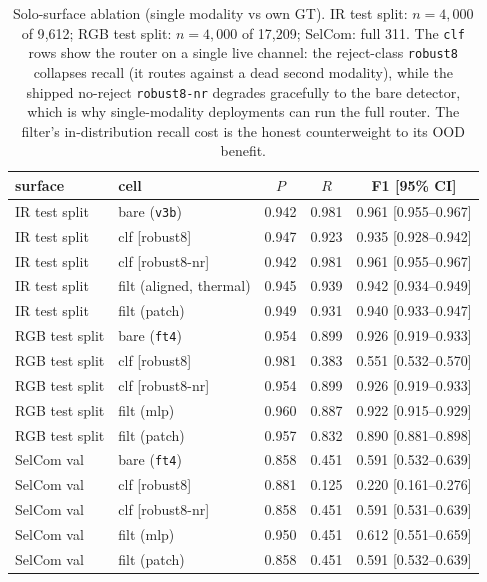 \begin{table}[htbp]
    \centering
    \caption{Solo-surface ablation (single modality vs own GT). IR test split: $n=4{,}000$ of 9{,}612; RGB test split: $n=4{,}000$ of 17{,}209; SelCom: full 311. The \texttt{clf} rows show the router on a single live channel: the reject-class \texttt{robust8} collapses recall (it routes against a dead second modality), while the shipped no-reject \texttt{robust8-nr} degrades gracefully to the bare detector, which is why single-modality deployments can run the full router. The filter's in-distribution recall cost is the honest counterweight to its OOD benefit.}
    \label{tab:ablation_solo}
    \begin{tabular}{llccc}
        \toprule
        surface & cell & $P$ & $R$ & F1 [95\% CI] \\
        \midrule
        IR test split & bare (\texttt{v3b})   & 0.942 & 0.981 & 0.961 [0.955--0.967] \\
        IR test split & clf [robust8]         & 0.947 & 0.923 & 0.935 [0.928--0.942] \\
        IR test split & clf [robust8-nr]      & 0.942 & 0.981 & 0.961 [0.955--0.967] \\
        IR test split & filt (aligned, thermal) & 0.945 & 0.939 & 0.942 [0.934--0.949] \\
        IR test split & filt (patch)          & 0.949 & 0.931 & 0.940 [0.933--0.947] \\
        RGB test split & bare (\texttt{ft4})  & 0.954 & 0.899 & 0.926 [0.919--0.933] \\
        RGB test split & clf [robust8]        & 0.981 & 0.383 & 0.551 [0.532--0.570] \\
        RGB test split & clf [robust8-nr]     & 0.954 & 0.899 & 0.926 [0.919--0.933] \\
        RGB test split & filt (mlp)           & 0.960 & 0.887 & 0.922 [0.915--0.929] \\
        RGB test split & filt (patch)         & 0.957 & 0.832 & 0.890 [0.881--0.898] \\
        SelCom val & bare (\texttt{ft4})      & 0.858 & 0.451 & 0.591 [0.532--0.639] \\
        SelCom val & clf [robust8]            & 0.881 & 0.125 & 0.220 [0.161--0.276] \\
        SelCom val & clf [robust8-nr]         & 0.858 & 0.451 & 0.591 [0.531--0.639] \\
        SelCom val & filt (mlp)               & 0.950 & 0.451 & 0.612 [0.551--0.659] \\
        SelCom val & filt (patch)             & 0.858 & 0.451 & 0.591 [0.532--0.639] \\
        \bottomrule
    \end{tabular}
\end{table}

